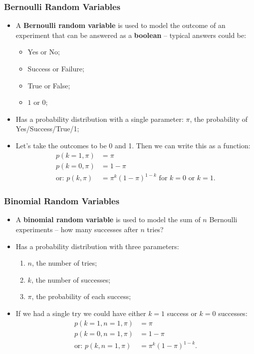 \documentclass[aspectratio=169]{beamer}
\theoremstyle{principle}
\begin{document}
\begin{frame}
\frametitle{Bernoulli Random Variables}

\begin{itemize}
\item A \textbf{Bernoulli random variable} is used to model the outcome of an experiment that can be answered as a \textbf{boolean} -- typical answers could be:
\begin{itemize}
\item  Yes or No;
\item Success or Failure;
\item True or False;
\item $1$ or $0$;
\end{itemize}
\bigskip

\item Has a probability distribution with a single parameter: $\pi$, the probability of Yes/Success/True/1;
\bigskip

\item Let's take the outcomes to be 0 and 1.  Then we can write this as a function:
\begin{align*}
p(k = 1,\pi) &= \pi\\
p(k = 0,\pi) &= 1 - \pi\\
\mbox{or: }p(k,\pi) &= \pi^k(1-\pi)^{1-k} \mbox{ for }k = 0\mbox{ or }k = 1.
\end{align*}

\end{itemize}

\end{frame}

\begin{frame}
\frametitle{Binomial Random Variables}

\begin{itemize}
\item A \textbf{binomial random variable} is used to model the sum of $n$ Bernoulli experiments -- how many successes after $n$ tries?
\bigskip

\item Has a probability distribution with three parameters:
\begin{enumerate}
\item $n$, the number of tries;
\item $k$, the number of successes;
\item $\pi$, the probability of each success;
\end{enumerate}
\bigskip

\item If we had a single try we could have either $k = 1$ success or $k=0$ successes:
\begin{align*}
p(k = 1,n=1,\pi) & = \pi\\
p(k = 0,n=1,\pi) & = 1 - \pi\\
\mbox{or: }p(k,n=1,\pi) &= \pi^k(1-\pi)^{1-k}.
\end{align*}

\end{itemize}

\end{frame}
\end{document}
